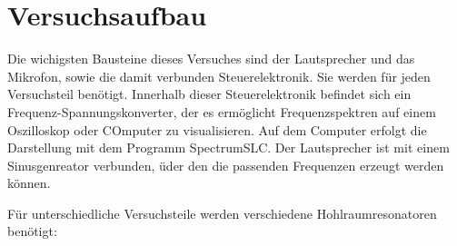 \section{Versuchsaufbau}
\label{sec:Versuchsaufbau}
Die wichigsten Bausteine dieses Versuches sind der Lautsprecher und das Mikrofon, sowie 
die damit verbunden Steuerelektronik. Sie werden für jeden Versuchsteil benötigt.
Innerhalb dieser Steuerelektronik befindet sich ein Frequenz-Spannungskonverter, 
der es ermöglicht Frequenzspektren auf einem Oszilloskop oder COmputer zu visualisieren.
Auf dem Computer erfolgt die Darstellung mit dem Programm SpectrumSLC.
Der Lautsprecher ist mit einem Sinusgenreator verbunden, üder den die passenden 
Frequenzen erzeugt werden können.

Für unterschiedliche Versuchsteile werden verschiedene Hohlraumresonatoren benötigt:
